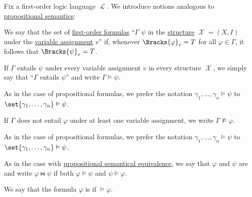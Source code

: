 \begin{remark}\label{rem:first_order_entailment_without_closed_formulas}
\end{remark}

\begin{definition}\label{def:first_order_semantics}
  Fix a first-order logic language \( \mscrL \). We introduce notions analogous to \hyperref[def:propositional_entailment]{propositional semantics}:
  \begin{thmenum}
     We say that the set of \hyperref[def:first_order_syntax/formula]{first-order formulas} \enquote{\( \Gamma \)  \( \psi \) in the \hyperref[def:first_order_structure]{structure} \( \mscrX = (X, I) \) under the \hyperref[def:first_order_valuation/variable_assignment]{variable assignment} \( v \)} if, whenever \( \Bracks{\varphi}_v = T \) for all \( \varphi \in \Gamma \), it follows that \( \Bracks{\psi}_v = T \).

     If \( \Gamma \) entails \( \psi \) under every variable assignment \( v \) in every structure \( \mscrX \), we simply say that \enquote{\( \Gamma \) entails \( \psi \)} and write \( \Gamma \vDash \psi \).

    As in the case of propositional formulas, we prefer the notation \( \gamma_1, \ldots, \gamma_n \vDash \psi \) to \( \set{ \gamma_1, \ldots, \gamma_n } \vDash \psi \).

    If \( \Gamma \) does not entail \( \varphi \) under at least one variable assignment, we write \( \Gamma \not\vDash \varphi \).

    As in the case of propositional formulas, we prefer the notation \( \gamma_1, \ldots, \gamma_n \vDash \psi \) to \( \set{ \gamma_1, \ldots, \gamma_n } \vDash \psi \).

     As in the case with \hyperref[def:semantic_equivalence]{propositional semantical equivalence}, we say that \( \varphi \) and \( \psi \) are  and write \( \varphi \gleichstark \psi \) if both \( \varphi \vDash \psi \) and \( \psi \vDash \varphi \).

     We say that the formula \( \varphi \) is  if \( \vDash \varphi \).
  \end{thmenum}
\end{definition}
